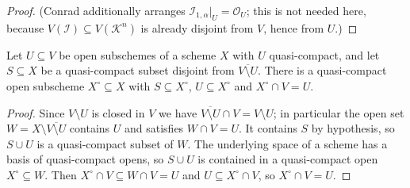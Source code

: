 \begin{proof}
  (Conrad additionally arranges $\mathcal I_{1,\alpha}|_U=\mathcal O_U$; this
  is not needed here, because $V(\mathcal I)\subseteq V(\mathcal K^n)$ is
  already disjoint from $V$, hence from $U$.)
\end{proof}

\begin{lemma}
  \label{lemma:nagata-conrad-case3-smaller-base}
  \leanok

  Let $U\subseteq V$ be open subschemes of a scheme $X$ with $U$ quasi-compact,
  and let $S\subseteq X$ be a quasi-compact subset disjoint from
  $\overline{V\setminus U}$.  There is a quasi-compact open subscheme
  $X^{\circ}\subseteq X$ with $S\subseteq X^{\circ}$, $U\subseteq X^{\circ}$
  and $X^{\circ}\cap V=U$.
\end{lemma}

\begin{proof}
  \leanok
  Since $V\setminus U$ is closed in $V$ we have
  $\overline{V\setminus U}\cap V=V\setminus U$; in particular the open set
  $W=X\setminus\overline{V\setminus U}$ contains $U$ and satisfies
  $W\cap V=U$.  It contains $S$ by hypothesis, so $S\cup U$ is a quasi-compact
  subset of $W$.  The underlying space of a scheme has a basis of quasi-compact
  opens, so $S\cup U$ is contained in a quasi-compact open
  $X^{\circ}\subseteq W$.  Then $X^{\circ}\cap V\subseteq W\cap V=U$ and
  $U\subseteq X^{\circ}\cap V$, so $X^{\circ}\cap V=U$.
\end{proof}

